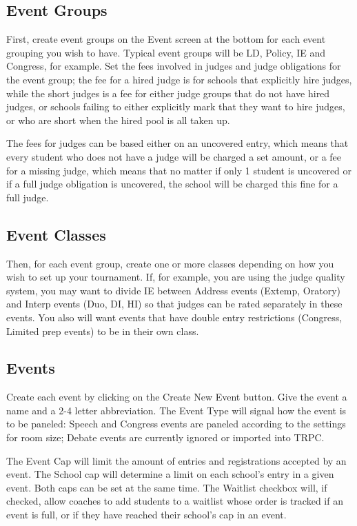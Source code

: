 \documentclass[12pt]{report} \usepackage {fullpage} \usepackage{times}
\begin{document}
 	
\subsection{Event Groups}

First, create event groups on the Event screen at the bottom for each event
grouping you wish to have.  Typical event groups will be LD, Policy, IE and
Congress, for example.   Set the fees involved in judges and judge
obligations for the event group; the fee for a hired judge is for schools
that explicitly hire judges, while the short judges is a fee for either
judge groups that do not have hired judges, or schools failing to either
explicitly mark that they want to hire judges, or who are short when the
hired pool is all taken up.

The fees for judges can be based either on an uncovered entry, which means
that every student who does not have a judge will be charged a set amount,
or a fee for a missing judge, which means that no matter if only 1 student
is uncovered or if a full judge obligation is uncovered, the school will be
charged this fine for a full judge. 

 	
\subsection{Event Classes} Then, for each event group, create one or more
classes depending on how you wish to set up your tournament.  If, for
example, you are using the judge quality system, you may want to divide IE
between Address events (Extemp, Oratory) and Interp events (Duo, DI, HI) so
that judges can be rated separately in these events.   You also will want
events that have double entry restrictions (Congress, Limited prep events)
to be in their own class.

 	
\subsection{Events}

Create each event by clicking on the Create New Event button.  Give the
event a name and a 2-4 letter abbreviation.   The Event Type will signal
how the event is to be paneled:  Speech and Congress events are paneled
according to the settings for room size; Debate events are currently
ignored or imported into TRPC.

The Event Cap will limit the amount of entries and registrations accepted
by an event.     The School cap will determine a limit on each school's
entry in a given event.  Both caps can be set at the same time.  The
Waitlist checkbox will, if checked, allow coaches to add students to a
waitlist whose order is tracked if an event is full, or if they have
reached their school's cap in an event. 
\end{document}
